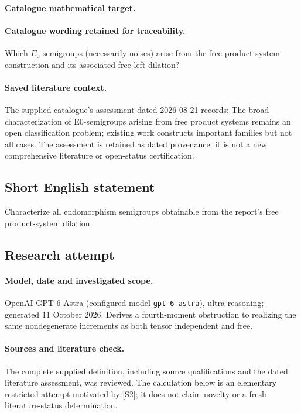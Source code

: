 \documentclass[11pt]{article}
\begin{document}
\paragraph{Catalogue mathematical target.}
\paragraph{Catalogue wording retained for traceability.}
Which $E_0$-semigroups (necessarily noises) arise from the free-product-system construction and its associated free left dilation?

\paragraph{Saved literature context.} The supplied catalogue's assessment dated 2026-08-21 records: The broad characterization of E0-semigroups arising from free product systems remains an open classification problem; existing work constructs important families but not all cases. The assessment is retained as dated provenance; it is not a new comprehensive literature or open-status certification.
\subsection{Short English statement}
Characterize all endomorphism semigroups obtainable from the report's free product-system dilation.
\subsection{Research attempt}
\paragraph{Model, date and investigated scope.}
OpenAI GPT-6 Astra (configured model \texttt{gpt-6-astra}), ultra reasoning; generated 11 October 2026. Derives a fourth-moment obstruction to realizing the same nondegenerate increments as both tensor independent and free.

\paragraph{Sources and literature check.}
The complete supplied definition, including source qualifications and the dated literature assessment, was reviewed. The calculation below is an elementary restricted attempt motivated by [S2]; it does not claim novelty or a fresh literature-status determination.
\end{document}

